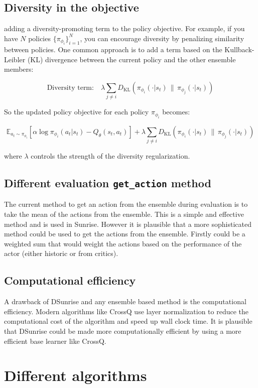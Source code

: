 \subsection{Diversity in the objective}
adding a diversity-promoting term to the policy objective. For example, if you have $N$ policies $\{\pi_{\phi_i}\}_{i=1}^N$, you can encourage diversity by penalizing similarity between policies. One common approach is to add a term based on the Kullback-Leibler (KL) divergence between the current policy and the other ensemble members:

\[
\text{Diversity term:} \quad \lambda \sum_{j \neq i} D_{\mathrm{KL}}\left(\pi_{\phi_i}(\cdot|s_t) \,\|\, \pi_{\phi_j}(\cdot|s_t)\right)
\]

So the updated policy objective for each policy $\pi_{\phi_i}$ becomes:

\[
\mathbb{E}_{a_t \sim \pi_{\phi_i}}\left[ \alpha \log \pi_{\phi_i} (a_t|s_t) - Q_\theta(s_t, a_t) \right]
+ \lambda \sum_{j \neq i} D_{\mathrm{KL}}\left(\pi_{\phi_i}(\cdot|s_t) \,\|\, \pi_{\phi_j}(\cdot|s_t)\right)
\]

where $\lambda$ controls the strength of the diversity regularization.

\subsection{Different evaluation \texttt{get\_action} method}
The current method to get an action from the ensemble during evaluation is to take the mean of the actions from the ensemble. This is a simple and effective method and is used in Sunrise. However it is plausible that a more sophisticated method could be used to get the actions from the ensemble. Firstly could be a weighted sum that would weight the actions based on the performance of the actor (either historic or from critics).

\subsection{Computational efficiency}
A drawback of DSunrise and any ensemble based method is the computational efficiency. Modern algorithms like CrossQ \cite{bhattCrossQBatchNormalization2024} use layer normalization to reduce the computational cost of the algorithm and speed up wall clock time. It is plausible that DSunrise could be made more computationally efficient by using a more efficient base learner like CrossQ.

\section{Different algorithms}

